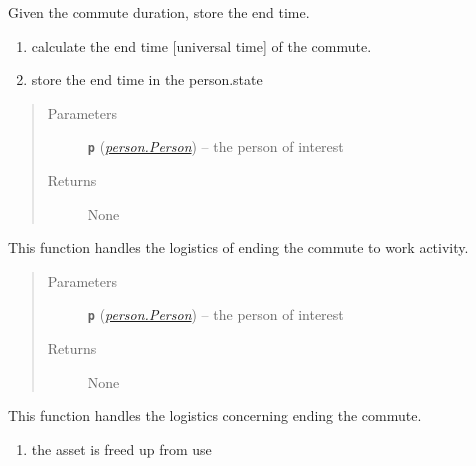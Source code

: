 \documentclass[letterpaper,10pt,english]{sphinxmanual}
\begin{document}
\begin{fulllineitems}

\begin{fulllineitems}
\label{commute:commute.Commute_To_Work.calc_end_time}
Given the commute duration, store the end time.
\begin{enumerate}
\item {} 
calculate the end time {[}universal time{]} of the commute.

\item {} 
store the end time in the person.state

\end{enumerate}
\begin{quote}\begin{description}
\item[{Parameters}] \leavevmode
\textbf{\texttt{p}} ({\hyperref[person:person.Person]{\emph{\emph{person.Person}}}}) -- the person of interest

\item[{Returns}] \leavevmode
None

\end{description}\end{quote}

\end{fulllineitems}


\begin{fulllineitems}
\label{commute:commute.Commute_To_Work.end}
This function handles the logistics of ending the commute to work activity.
\begin{quote}\begin{description}
\item[{Parameters}] \leavevmode
\textbf{\texttt{p}} ({\hyperref[person:person.Person]{\emph{\emph{person.Person}}}}) -- the person of interest

\item[{Returns}] \leavevmode
None

\end{description}\end{quote}

\end{fulllineitems}


\begin{fulllineitems}
\label{commute:commute.Commute_To_Work.end_commute}
This function handles the logistics concerning ending the commute.
\begin{enumerate}
\item {} 
the asset is freed up from use


\end{enumerate}
\end{fulllineitems}
\end{fulllineitems}
\end{document}
